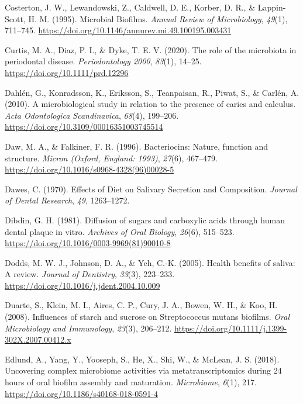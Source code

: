 \documentclass[
  b5paper,
]{book}
\newlength{\cslhangindent}
\newenvironment{CSLReferences}[2] %
 {\begin{list}{}{%
  \setlength{\itemindent}{0pt}
  \setlength{\leftmargin}{0pt}
  \setlength{\parsep}{0pt}
  \ifodd #1
   \setlength{\leftmargin}{\cslhangindent}
   \setlength{\itemindent}{-1\cslhangindent}
  \fi
  \setlength{\itemsep}{#2\baselineskip}}}
 {\end{list}}
\begin{document}
\begin{CSLReferences}{1}{0}
Costerton, J. W., Lewandowski, Z., Caldwell, D. E., Korber, D. R., \&
Lappin-Scott, H. M. (1995). Microbial {Biofilms}. \emph{Annual Review of
Microbiology}, \emph{49}(1), 711--745.
\url{https://doi.org/10.1146/annurev.mi.49.100195.003431}

Curtis, M. A., Diaz, P. I., \& Dyke, T. E. V. (2020). The role of the
microbiota in periodontal disease. \emph{Periodontology 2000},
\emph{83}(1), 14--25. \url{https://doi.org/10.1111/prd.12296}

Dahlén, G., Konradsson, K., Eriksson, S., Teanpaisan, R., Piwat, S., \&
Carlén, A. (2010). A microbiological study in relation to the presence
of caries and calculus. \emph{Acta Odontologica Scandinavica},
\emph{68}(4), 199--206. \url{https://doi.org/10.3109/00016351003745514}

Daw, M. A., \& Falkiner, F. R. (1996). Bacteriocins: Nature, function
and structure. \emph{Micron (Oxford, England: 1993)}, \emph{27}(6),
467--479. \url{https://doi.org/10.1016/s0968-4328(96)00028-5}

Dawes, C. (1970). Effects of {Diet} on {Salivary Secretion} and
{Composition}. \emph{Journal of Dental Research}, \emph{49}, 1263--1272.

Dibdin, G. H. (1981). Diffusion of sugars and carboxylic acids through
human dental plaque in vitro. \emph{Archives of Oral Biology},
\emph{26}(6), 515--523.
\url{https://doi.org/10.1016/0003-9969(81)90010-8}

Dodds, M. W. J., Johnson, D. A., \& Yeh, C.-K. (2005). Health benefits
of saliva: A review. \emph{Journal of Dentistry}, \emph{33}(3),
223--233. \url{https://doi.org/10.1016/j.jdent.2004.10.009}

Duarte, S., Klein, M. I., Aires, C. P., Cury, J. A., Bowen, W. H., \&
Koo, H. (2008). Influences of starch and sucrose on {Streptococcus}
mutans biofilms. \emph{Oral Microbiology and Immunology}, \emph{23}(3),
206--212. \url{https://doi.org/10.1111/j.1399-302X.2007.00412.x}

Edlund, A., Yang, Y., Yooseph, S., He, X., Shi, W., \& McLean, J. S.
(2018). Uncovering complex microbiome activities via metatranscriptomics
during 24 hours of oral biofilm assembly and maturation.
\emph{Microbiome}, \emph{6}(1), 217.
\url{https://doi.org/10.1186/s40168-018-0591-4}


\end{CSLReferences}
\end{document}
